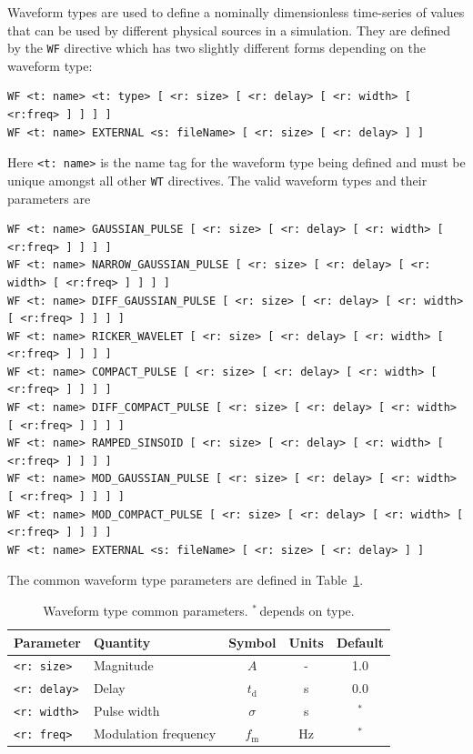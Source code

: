 \documentclass[onecolumn,a4paper]{article}
\numberwithin{equation}{section}
\begin{document}
Waveform types are used to define a nominally dimensionless time-series of values 
that can be used by different physical sources in a simulation. They are defined
by the \texttt{WF} directive which has two slightly different forms depending on the
waveform type:
\begin{verbatim}
WF <t: name> <t: type> [ <r: size> [ <r: delay> [ <r: width> [ <r:freq> ] ] ] ]
WF <t: name> EXTERNAL <s: fileName> [ <r: size> [ <r: delay> ] ]
\end{verbatim}
Here \texttt{<t:~name>} is the name tag for the waveform type being defined and must be unique 
amongst all other \texttt{WT} directives. The valid waveform types and their parameters are
\begin{verbatim}
WF <t: name> GAUSSIAN_PULSE [ <r: size> [ <r: delay> [ <r: width> [ <r:freq> ] ] ] ]
WF <t: name> NARROW_GAUSSIAN_PULSE [ <r: size> [ <r: delay> [ <r: width> [ <r:freq> ] ] ] ]
WF <t: name> DIFF_GAUSSIAN_PULSE [ <r: size> [ <r: delay> [ <r: width> [ <r:freq> ] ] ] ]
WF <t: name> RICKER_WAVELET [ <r: size> [ <r: delay> [ <r: width> [ <r:freq> ] ] ] ]
WF <t: name> COMPACT_PULSE [ <r: size> [ <r: delay> [ <r: width> [ <r:freq> ] ] ] ]
WF <t: name> DIFF_COMPACT_PULSE [ <r: size> [ <r: delay> [ <r: width> [ <r:freq> ] ] ] ]
WF <t: name> RAMPED_SINSOID [ <r: size> [ <r: delay> [ <r: width> [ <r:freq> ] ] ] ]
WF <t: name> MOD_GAUSSIAN_PULSE [ <r: size> [ <r: delay> [ <r: width> [ <r:freq> ] ] ] ]
WF <t: name> MOD_COMPACT_PULSE [ <r: size> [ <r: delay> [ <r: width> [ <r:freq> ] ] ] ]
WF <t: name> EXTERNAL <s: fileName> [ <r: size> [ <r: delay> ] ]
\end{verbatim}

The common waveform type parameters are defined in Table~\ref{tb:wfparm}.

\begin{table}[ht]
\begin{center}
\begin{tabular}{|l|l|c|c|c|}
\hline
Parameter           &Quantity             &Symbol         &Units &Default \\ 
\hline
\texttt{<r:~size>}  &Magnitude            &$A$            &-     &1.0     \\
\texttt{<r:~delay>} &Delay                &$t_\mathrm{d}$ &s     &0.0     \\
\texttt{<r:~width>} &Pulse width          &$\sigma$       &s     &$^*$    \\ 
\texttt{<r:~freq>}  &Modulation frequency &$f_\mathrm{m}$ &Hz    &$^*$    \\ 
\hline
\end{tabular}
\caption{\label{tb:wfparm}Waveform type common parameters. $^*$\,depends on type.}
\end{center}
\end{table}
\end{document}
